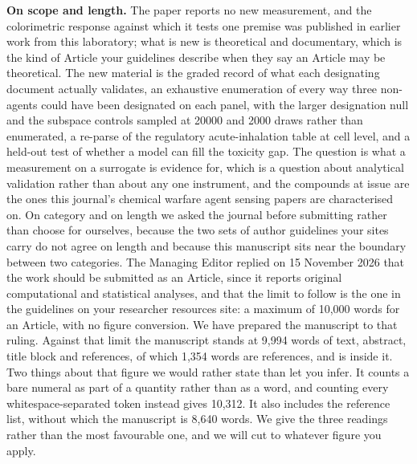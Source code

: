 \documentclass[11pt,a4paper]{article}
\begin{document}
\textbf{On scope and length.} The paper reports no new measurement, and the
colorimetric response against which it tests one premise was published in
earlier work from this laboratory; what is new is theoretical and documentary,
which is the kind of Article your guidelines describe when they say an Article
may be theoretical. The new material is the graded record of what each
designating document actually validates, an exhaustive enumeration of every
way three non-agents could have been designated on each panel, with the larger
designation null and the subspace controls sampled at 20000 and 2000 draws
rather than enumerated, a re-parse of the regulatory
acute-inhalation table at cell level, and a held-out test of whether a model
can fill the toxicity gap. The question is what a measurement on a
surrogate is evidence for, which is a question about analytical validation
rather than about any one instrument, and the compounds at issue are the ones
this journal's chemical warfare agent sensing papers are characterised on.
On category and on length we asked the journal before submitting rather than
choose for ourselves, because the two sets of author guidelines your sites
carry do not agree on length and because this manuscript sits near the boundary
between two categories. The Managing Editor replied on 15 November 2026 that
the work should be submitted as an Article, since it reports original
computational and statistical analyses, and that the limit to follow is the one
in the guidelines on your researcher resources site: a maximum of 10,000 words
for an Article, with no figure conversion. We have prepared the manuscript to
that ruling. Against that limit the manuscript stands at
9,994 words of text, abstract, title block and references, of which
1,354 words are references, and is inside it. Two things about that figure we
would rather state than let you infer. It counts a bare numeral as part of a
quantity rather than as a word, and counting every whitespace-separated token
instead gives 10,312. It also includes the reference list, without which the
manuscript is 8,640 words. We give the three readings rather than the most
favourable one, and we will cut to whatever figure you apply.
\end{document}

